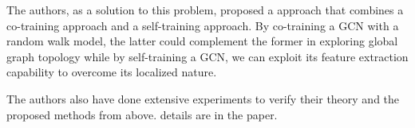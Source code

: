 \documentclass{article}
\begin{document}
The authors, as a solution to this problem, proposed a approach that combines a co-training approach and a self-training approach. By co-training a GCN with a random walk model, the latter could complement the former in exploring global graph topology while by self-training a GCN, we can exploit its feature extraction capability to overcome its localized nature.

The authors also have done extensive experiments to verify their theory and the proposed methods from above. details are in the paper.
\end{document}
